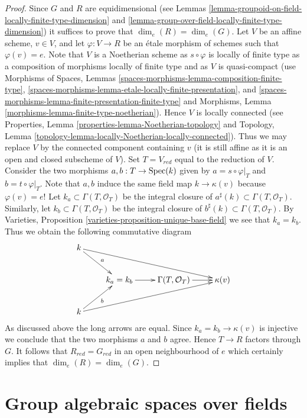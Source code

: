 \begin{proof}
Since $G$ and $R$ are equidimensional (see
Lemmas \ref{lemma-groupoid-on-field-locally-finite-type-dimension} and
\ref{lemma-group-over-field-locally-finite-type-dimension})
it suffices to prove that $\dim_e(R) = \dim_e(G)$. Let $V$ be an affine scheme,
$v \in V$, and let $\varphi : V \to R$ be an \'etale morphism of schemes
such that $\varphi(v) = e$. Note that $V$ is a Noetherian scheme as
$s \circ \varphi$ is locally of finite type as a composition of morphisms
locally of finite type and as $V$ is quasi-compact (use
Morphisms of Spaces, Lemmas
\ref{spaces-morphisms-lemma-composition-finite-type},
\ref{spaces-morphisms-lemma-etale-locally-finite-presentation}, and
\ref{spaces-morphisms-lemma-finite-presentation-finite-type}
and
Morphisms, Lemma \ref{morphisms-lemma-finite-type-noetherian}).
Hence $V$ is locally connected (see
Properties, Lemma \ref{properties-lemma-Noetherian-topology}
and
Topology, Lemma \ref{topology-lemma-locally-Noetherian-locally-connected}).
Thus we may replace $V$ by the connected component containing $v$ (it
is still affine as it is an open and closed subscheme of $V$).
Set $T = V_{red}$ equal to the reduction of $V$. Consider the two
morphisms $a, b : T \to \mathop{\mathrm{Spec}}(k)$ given by
$a = s \circ \varphi|_T$ and $b = t \circ \varphi|_T$. Note that
$a, b$ induce the same field map $k \to \kappa(v)$ because $\varphi(v) = e$!
Let $k_a \subset \Gamma(T, \mathcal{O}_T)$ be the integral closure of
$a^\sharp(k) \subset \Gamma(T, \mathcal{O}_T)$. Similarly, let
$k_b \subset \Gamma(T, \mathcal{O}_T)$ be the integral closure of
$b^\sharp(k) \subset \Gamma(T, \mathcal{O}_T)$. By
Varieties, Proposition \ref{varieties-proposition-unique-base-field}
we see that $k_a = k_b$. Thus we obtain the following commutative diagram
$$
\xymatrix{
k \ar[rd]^a \ar[rrrd] \\
& k_a = k_b \ar[r] & \Gamma(T, \mathcal{O}_T) \ar[r] & \kappa(v) \\
k \ar[ru]_b \ar[rrru]
}
$$
As discussed above the long arrows are equal.
Since $k_a = k_b \to \kappa(v)$ is injective we conclude that
the two morphisms $a$ and $b$ agree. Hence $T \to R$ factors through $G$.
It follows that $R_{red} = G_{red}$ in an open neighbourhood of $e$
which certainly implies that $\dim_e(R) = \dim_e(G)$.
\end{proof}






\section{Group algebraic spaces over fields}
\label{section-group-algebraic-spaces-over-fields}

